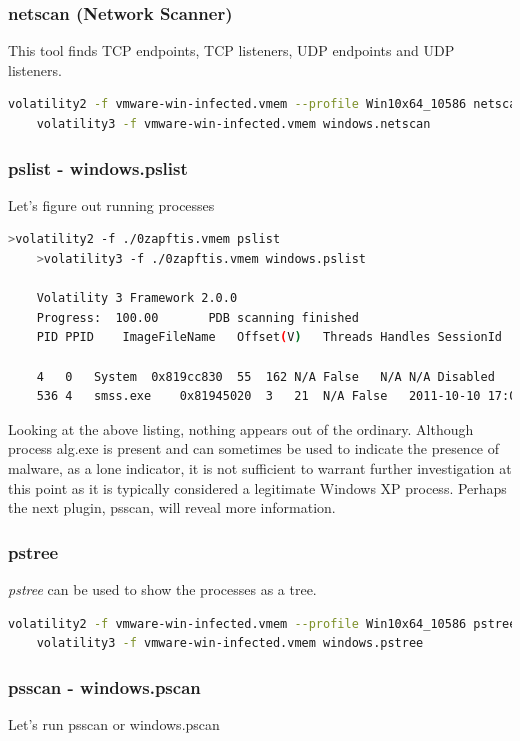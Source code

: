 \subsubsection{netscan (Network Scanner)}
This tool finds TCP endpoints, TCP listeners, UDP endpoints and UDP listeners.

\begin{lstlisting}[language=bash]
    volatility2 -f vmware-win-infected.vmem --profile Win10x64_10586 netscan
    volatility3 -f vmware-win-infected.vmem windows.netscan
\end{lstlisting}

\subsubsection{pslist - windows.pslist}
Let's figure out running processes

\begin{lstlisting}[language=bash]
    >volatility2 -f ./0zapftis.vmem pslist
    >volatility3 -f ./0zapftis.vmem windows.pslist

    Volatility 3 Framework 2.0.0
    Progress:  100.00		PDB scanning finished
    PID	PPID	ImageFileName	Offset(V)	Threads	Handles	SessionId	Wow64	CreateTime	ExitTime	File output

    4	0	System	0x819cc830	55	162	N/A	False	N/A	N/A	Disabled
    536	4	smss.exe	0x81945020	3	21	N/A	False	2011-10-10 17:03:56.000000 	N/A	Disabled
\end{lstlisting}

Looking at the above listing, nothing appears out of the ordinary. Although process alg.exe is present and can sometimes be used to indicate the presence of malware, as a lone indicator, it is not sufficient to warrant further investigation at this point as it is typically considered a legitimate Windows XP process. Perhaps the next plugin, psscan, will reveal more information.


\subsubsection{pstree}
\textit{pstree} can be used to show the processes as a tree.

\begin{lstlisting}[language=bash]
    volatility2 -f vmware-win-infected.vmem --profile Win10x64_10586 pstree
    volatility3 -f vmware-win-infected.vmem windows.pstree
\end{lstlisting}

\subsubsection{psscan - windows.pscan}
Let's run psscan or windows.pscan

